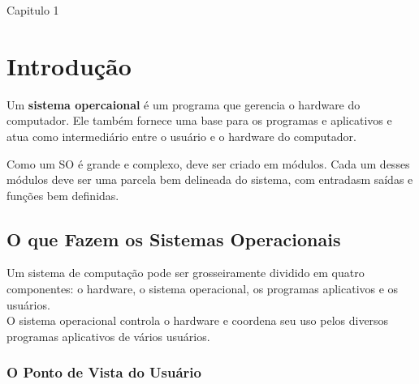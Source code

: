 \documentclass[a4paper, 12pt]{article}
\begin{document}
\LARGE{Capitulo 1}

\section{Introdução}

Um \textbf{sistema opercaional} é um programa que gerencia o hardware do computador. Ele também fornece uma base para os programas e aplicativos e atua como intermediário entre o usuário e o hardware do computador. \par

Como um SO é grande e complexo, deve ser criado em módulos. Cada um desses módulos deve ser uma parcela bem delineada do sistema, com entradasm saídas e funções bem definidas. \par


\subsection{O que Fazem os Sistemas Operacionais}

Um sistema de computação pode ser grosseiramente dividido em quatro componentes: o hardware, o sistema operacional, os programas aplicativos e os usuários. \\

O sistema operacional controla o hardware e coordena seu uso pelos diversos programas aplicativos de vários usuários. \\

\subsubsection{O Ponto de Vista do Usuário}
\end{document}
